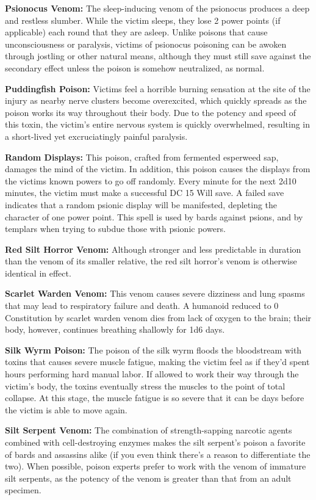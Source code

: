\textbf{Psionocus Venom:} The sleep-inducing venom of the psionocus produces a deep and restless slumber. While the victim sleeps, they lose 2 power points (if applicable) each round that they are asleep. Unlike poisons that cause unconsciousness or paralysis, victims of psionocus poisoning can be awoken through jostling or other natural means, although they must still save against the secondary effect unless the poison is somehow neutralized, as normal.

\textbf{Puddingfish Poison:} Victims feel a horrible burning sensation at the site of the injury as nearby nerve clusters become overexcited, which quickly spreads as the poison works its way throughout their body. Due to the potency and speed of this toxin, the victim's entire nervous system is quickly overwhelmed, resulting in a short-lived yet excruciatingly painful paralysis.

\textbf{Random Displays:} This poison, crafted from fermented esperweed sap, damages the mind of the victim. In addition, this poison causes the displays from the victims known powers to go off randomly. Every minute for the next 2d10 minutes, the victim must make a successful DC 15 Will save. A failed save indicates that a random psionic display will be manifested, depleting the character of one power point. This spell is used by bards against psions, and by templars when trying to subdue those with psionic powers.

\textbf{Red Silt Horror Venom:} Although stronger and less predictable in duration than the venom of its smaller relative, the red silt horror's venom is otherwise identical in effect.

\textbf{Scarlet Warden Venom:} This venom causes severe dizziness and lung spasms that may lead to respiratory failure and death. A humanoid reduced to 0 Constitution by scarlet warden venom dies from lack of oxygen to the brain; their body, however, continues breathing shallowly for 1d6 days.

\textbf{Silk Wyrm Poison:} The poison of the silk wyrm floods the bloodstream with toxins that causes severe muscle fatigue, making the victim feel as if they'd spent hours performing hard manual labor. If allowed to work their way through the victim's body, the toxins eventually stress the muscles to the point of total collapse. At this stage, the muscle fatigue is so severe that it can be days before the victim is able to move again.

\textbf{Silt Serpent Venom:} The combination of strength-sapping narcotic agents combined with cell-destroying enzymes makes the silt serpent's poison a favorite of bards and assassins alike (if you even think there's a reason to differentiate the two). When possible, poison experts prefer to work with the venom of immature silt serpents, as the potency of the venom is greater than that from an adult specimen.

